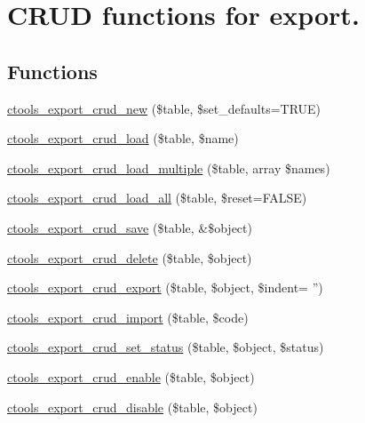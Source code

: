 \hypertarget{group__export__crud}{
\section{CRUD functions for export.}
\label{group__export__crud}
}
\subsection*{Functions}
\begin{DoxyCompactItemize}
\item 
\hyperlink{group__export__crud_gafa3d98363b3c0cd3aa90d2d4e9215fbc}{ctools\_\-export\_\-crud\_\-new} (\$table, \$set\_\-defaults=TRUE)
\item 
\hyperlink{group__export__crud_gafdb2a891145f268c573653fe61c79fa3}{ctools\_\-export\_\-crud\_\-load} (\$table, \$name)
\item 
\hyperlink{group__export__crud_ga9394c795ebcc27aa0078668ba1b80102}{ctools\_\-export\_\-crud\_\-load\_\-multiple} (\$table, array \$names)
\item 
\hyperlink{group__export__crud_gac25f1e05b48984949bfa0d82e2f6908b}{ctools\_\-export\_\-crud\_\-load\_\-all} (\$table, \$reset=FALSE)
\item 
\hyperlink{group__export__crud_ga026370fc39c98bb82c70f223642044cf}{ctools\_\-export\_\-crud\_\-save} (\$table, \&\$object)
\item 
\hyperlink{group__export__crud_gac99a2a09acebd603aeff488b24ed1362}{ctools\_\-export\_\-crud\_\-delete} (\$table, \$object)
\item 
\hyperlink{group__export__crud_ga7c6ace5b3a936babe3394b02c5fa2f50}{ctools\_\-export\_\-crud\_\-export} (\$table, \$object, \$indent= '')
\item 
\hyperlink{group__export__crud_gacef0d6e3eee416774e6e08c497ed62bb}{ctools\_\-export\_\-crud\_\-import} (\$table, \$code)
\item 
\hyperlink{group__export__crud_gabece68057272d59c9fcb6529bbd81211}{ctools\_\-export\_\-crud\_\-set\_\-status} (\$table, \$object, \$status)
\item 
\hyperlink{group__export__crud_gaf83f6d3c4b7d96b62ef7201de24ce0b7}{ctools\_\-export\_\-crud\_\-enable} (\$table, \$object)
\item 
\hyperlink{group__export__crud_ga1f0a12ff967fe1204072ff22267da14e}{ctools\_\-export\_\-crud\_\-disable} (\$table, \$object)
\end{DoxyCompactItemize}


